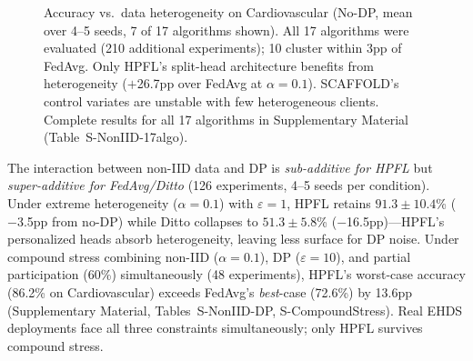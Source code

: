 \documentclass[conference,letterpaper]{IEEEtran}
\begin{document}
\begin{figure}[htbp]
\centering
{}
\caption{Accuracy vs.\ data heterogeneity on Cardiovascular (No-DP, mean over 4--5 seeds, 7 of 17 algorithms shown). All 17 algorithms were evaluated (210 additional experiments); 10 cluster within 3pp of FedAvg. Only HPFL's split-head architecture benefits from heterogeneity ($+$26.7pp over FedAvg at $\alpha{=}0.1$). SCAFFOLD's control variates are unstable with few heterogeneous clients. Complete results for all 17 algorithms in Supplementary Material (Table~S-NonIID-17algo).}
\label{fig:noniid_impact}
\end{figure}

The interaction between non-IID data and DP is \textit{sub-additive for HPFL} but \textit{super-additive for FedAvg/Ditto} (126 experiments, 4--5 seeds per condition). Under extreme heterogeneity ($\alpha{=}0.1$) with $\varepsilon{=}1$, HPFL retains $91.3 \pm 10.4$\% ($-$3.5pp from no-DP) while Ditto collapses to $51.3 \pm 5.8$\% ($-$16.5pp)---HPFL's personalized heads absorb heterogeneity, leaving less surface for DP noise. Under compound stress combining non-IID ($\alpha{=}0.1$), DP ($\varepsilon{=}10$), and partial participation (60\%) simultaneously (48 experiments), HPFL's worst-case accuracy (86.2\% on Cardiovascular) exceeds FedAvg's \textit{best}-case (72.6\%) by 13.6pp (Supplementary Material, Tables~S-NonIID-DP, S-CompoundStress). Real EHDS deployments face all three constraints simultaneously; only HPFL survives compound stress.
\end{document}
